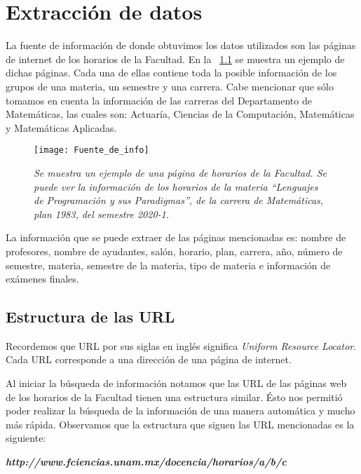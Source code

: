 \chapter{Extracción de datos}

La fuente de información de donde obtuvimos los datos utilizados son las páginas de internet de los horarios de la Facultad. En la \figurename{~\ref{pagFC}} se muestra un ejemplo de dichas páginas. Cada una de ellas contiene toda la posible información de los grupos de una materia, un semestre y una carrera. Cabe mencionar que sólo tomamos en cuenta la información de las carreras del Departamento de Matemáticas, las cuales son: Actuaría, Ciencias de la Computación, Matemáticas y Matemáticas Aplicadas.

\begin{figure}[H]
\centering
\texttt{[image: Fuente\_de\_info]} %
\caption[\textit{Página de horarios de la Facultad}]{\textit{Se muestra un ejemplo de una página de horarios de la Facultad. Se puede ver la información de los horarios de la materia ``Lenguajes de Programación y sus Paradigmas'', de la carrera de Matemáticas, plan 1983, del semestre 2020-1.}}\label{pagFC}
\end{figure}

La información que se puede extraer de las páginas mencionadas es: nombre de profesores, nombre de ayudantes, salón, horario, plan, carrera, año, número de semestre, materia, semestre de la materia, tipo de materia e información de exámenes finales.


\section{Estructura de las URL} \label{Sec_ED_estructura_URL}

Recordemos que URL por sus siglas en inglés significa \textit{Uniform Resource Locator}. Cada URL corresponde a una dirección de una página de internet. %

Al iniciar la búsqueda de información notamos que las URL de las páginas web de los horarios de la Facultad tienen una estructura similar. Ésto nos permitió poder realizar la búsqueda de la información de una manera automática y mucho más rápida. Observamos que la estructura que siguen las URL mencionadas es la siguiente:
  
  \begin{center}
\textit{\textbf{http://www.fciencias.unam.mx/docencia/horarios/a/b/c}}
\end{center}

